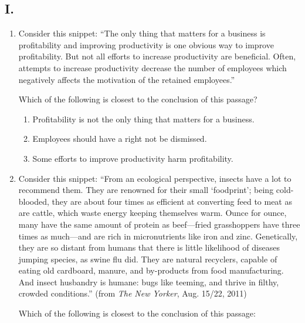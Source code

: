 \subsection*{I.}

\begin{enumerate}

\item Consider this snippet: ``The only thing that matters for a business is 
 profitability and improving productivity is one obvious way to improve 
 profitability. But not all efforts to increase productivity are beneficial.  
 Often, attempts to increase productivity
decrease the number of employees which negatively affects the motivation of the 
retained employees.''

Which of the following is closest to the conclusion of this passage?

\begin{enumerate}

 \item Profitability is not the only thing that matters for a business.

 \item Employees should have a right not be dismissed.

 \item Some efforts to improve productivity harm profitability.

\end{enumerate}
\item Consider this snippet: ``From an ecological perspective, insects have a 
 lot to recommend them.  They are renowned for their small `foodprint'; being 
 cold-blooded, they are about four times as efficient at converting feed to meat 
 as are cattle, which waste energy keeping themselves warm. Ounce for ounce, 
 many have the same amount of protein as beef—fried grasshoppers have three 
 times as much—and are rich in micronutrients like iron and zinc. Genetically, 
 they are so distant from humans that there is little likelihood of diseases 
 jumping species, as swine flu did.  They are natural recyclers, capable of 
 eating old cardboard, manure, and by-products from food manufacturing. And 
 insect husbandry is humane: bugs like teeming, and thrive in filthy, crowded 
 conditions.'' (from \emph{The New Yorker}, Aug. 15/22, 2011)

 Which of the following is closest to the conclusion of this passage:


\end{enumerate}

